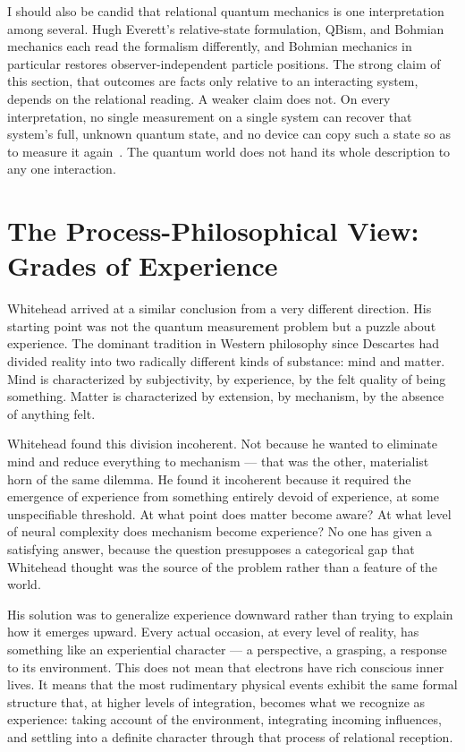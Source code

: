 I should also be candid that relational quantum mechanics is one interpretation among several.
Hugh Everett's relative-state formulation, QBism, and Bohmian mechanics each read the formalism differently, and Bohmian mechanics in particular restores observer-independent particle positions.
The strong claim of this section, that outcomes are facts only relative to an interacting system, depends on the relational reading.
A weaker claim does not.
On every interpretation, no single measurement on a single system can recover that system's full, unknown quantum state, and no device can copy such a state so as to measure it again~\citep{NielsenChuang2000}.
The quantum world does not hand its whole description to any one interaction.

\section{The Process-Philosophical View: Grades of Experience}
\label{sec:ch9-process}

Whitehead arrived at a similar conclusion from a very different direction.
His starting point was not the quantum measurement problem but a puzzle about experience.
The dominant tradition in Western philosophy since Descartes had divided reality into two radically different kinds of substance: mind and matter.
Mind is characterized by subjectivity, by experience, by the felt quality of being something.
Matter is characterized by extension, by mechanism, by the absence of anything felt.

Whitehead found this division incoherent.
Not because he wanted to eliminate mind and reduce everything to mechanism --- that was the other, materialist horn of the same dilemma.
He found it incoherent because it required the emergence of experience from something entirely devoid of experience, at some unspecifiable threshold.
At what point does matter become aware?
At what level of neural complexity does mechanism become experience?
No one has given a satisfying answer, because the question presupposes a categorical gap that Whitehead thought was the source of the problem rather than a feature of the world.

His solution was to generalize experience downward rather than trying to explain how it emerges upward.
Every actual occasion, at every level of reality, has something like an experiential character --- a perspective, a grasping, a response to its environment.
This does not mean that electrons have rich conscious inner lives.
It means that the most rudimentary physical events exhibit the same formal structure that, at higher levels of integration, becomes what we recognize as experience: taking account of the environment, integrating incoming influences, and settling into a definite character through that process of relational reception.

